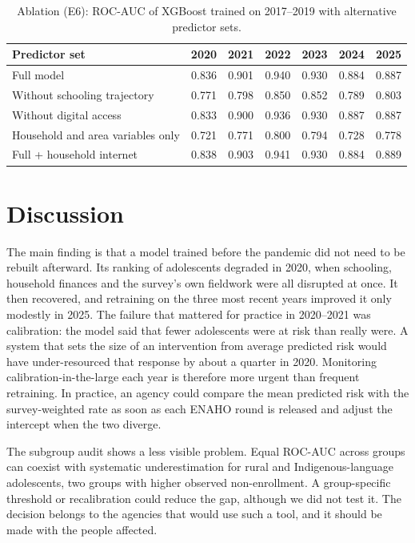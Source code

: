\documentclass[conference]{IEEEtran}
\begin{document}
\begin{table}[t]
\caption{Ablation (E6): ROC-AUC of XGBoost trained on 2017--2019 with alternative predictor sets.}
\label{tab:abl}
\centering
\setlength{\tabcolsep}{2.4pt}
\scriptsize
\begin{tabular}{lcccccc}
\toprule
Predictor set & 2020 & 2021 & 2022 & 2023 & 2024 & 2025 \\
\midrule
Full model & 0.836 & 0.901 & 0.940 & 0.930 & 0.884 & 0.887 \\
Without schooling trajectory & 0.771 & 0.798 & 0.850 & 0.852 & 0.789 & 0.803 \\
Without digital access & 0.833 & 0.900 & 0.936 & 0.930 & 0.887 & 0.887 \\
Household and area variables only & 0.721 & 0.771 & 0.800 & 0.794 & 0.728 & 0.778 \\
Full + household internet & 0.838 & 0.903 & 0.941 & 0.930 & 0.884 & 0.889 \\
\bottomrule
\end{tabular}
\end{table}

\section{Discussion}

The main finding is that a model trained before the pandemic did not need to be rebuilt afterward. Its ranking of adolescents degraded in 2020, when schooling, household finances and the survey's own fieldwork were all disrupted at once. It then recovered, and retraining on the three most recent years improved it only modestly in 2025. The failure that mattered for practice in 2020--2021 was calibration: the model said that fewer adolescents were at risk than really were. A system that sets the size of an intervention from average predicted risk would have under-resourced that response by about a quarter in 2020. Monitoring calibration-in-the-large each year is therefore more urgent than frequent retraining. In practice, an agency could compare the mean predicted risk with the survey-weighted rate as soon as each ENAHO round is released and adjust the intercept when the two diverge.

The subgroup audit shows a less visible problem. Equal ROC-AUC across groups can coexist with systematic underestimation for rural and Indigenous-language adolescents, two groups with higher observed non-enrollment. A group-specific threshold or recalibration could reduce the gap, although we did not test it. The decision belongs to the agencies that would use such a tool, and it should be made with the people affected.
\end{document}
